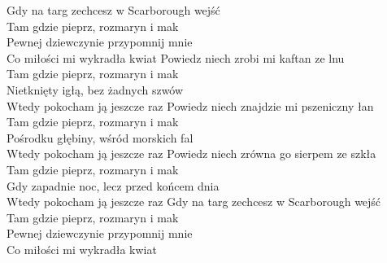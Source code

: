 
Gdy na targ zechcesz w Scarborough wejść\\
Tam gdzie pieprz, rozmaryn i mak \\
Pewnej dziewczynie przypomnij mnie\\
Co miłości mi wykradła kwiat 
\hops
Powiedz niech zrobi mi kaftan ze lnu\\
Tam gdzie pieprz, rozmaryn i mak\\
Nietknięty igłą, bez żadnych szwów \\
Wtedy pokocham ją jeszcze raz 
\hops
Powiedz niech znajdzie mi pszeniczny łan \\
Tam gdzie pieprz, rozmaryn i mak \\
Pośrodku głębiny, wśród morskich fal \\
Wtedy pokocham ją jeszcze raz 
\hops
Powiedz niech zrówna go sierpem ze szkła \\
Tam gdzie pieprz, rozmaryn i mak \\
Gdy zapadnie noc, lecz przed końcem dnia \\
Wtedy pokocham ją jeszcze raz
\hops
Gdy na targ zechcesz w Scarborough wejść\\
Tam gdzie pieprz, rozmaryn i mak \\
Pewnej dziewczynie przypomnij mnie\\
Co miłości mi wykradła kwiat 